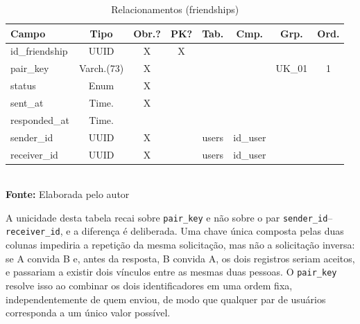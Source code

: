 \FloatBarrier
\begin{table}[!htbp]
\centering
\caption{Relacionamentos (friendships)}
\footnotesize
\begin{tabularx}{\textwidth}{ | X | c | c | c | c | c | c | c | }
    \hline
    \textbf{Campo} & \textbf{Tipo} & \textbf{Obr.?} & \textbf{PK?} & \textbf{Tab.} & \textbf{Cmp.} & \textbf{Grp.} & \textbf{Ord.}\\ \hline
    id\_friendship & UUID & X & X &  &  &  &  \\ \hline
    pair\_key & Varch.(73) & X &  &  &  & UK\_01 & 1 \\ \hline
    status & Enum & X &  &  &  &  &  \\ \hline
    sent\_at & Time. & X &  &  &  &  &  \\ \hline
    responded\_at & Time. &  &  &  &  &  &  \\ \hline
    sender\_id & UUID & X &  & users & id\_user &  &  \\ \hline
    receiver\_id & UUID & X &  & users & id\_user &  &  \\ \hline
\end{tabularx}
\vspace{0.1cm} \\ \textbf{Fonte:} Elaborada pelo autor
\label{tab:tabelaFriendshipDetalhado}
\end{table}

A unicidade desta tabela recai sobre \texttt{pair\_key} e não sobre o par \texttt{sender\_id}--\texttt{receiver\_id}, e a diferença é deliberada. Uma chave única composta pelas duas colunas impediria a repetição da mesma solicitação, mas não a solicitação inversa: se A convida B e, antes da resposta, B convida A, os dois registros seriam aceitos, e passariam a existir dois vínculos entre as mesmas duas pessoas. O \texttt{pair\_key} resolve isso ao combinar os dois identificadores em uma ordem fixa, independentemente de quem enviou, de modo que qualquer par de usuários corresponda a um único valor possível.

